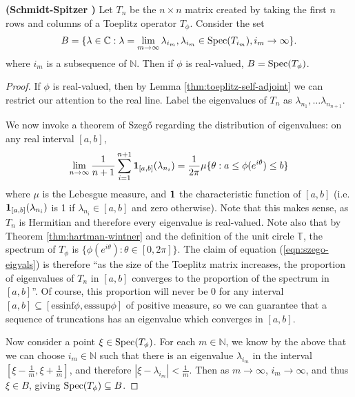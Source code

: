 \documentclass[../main.tex]{subfiles}
\begin{document}
\begin{theorem}{\textbf{(Schmidt-Spitzer \parencite{schmidt1960toeplitz})}}
Let $T_n$ be the $n \times n$ matrix created by taking the first $n$ rows and columns of a Toeplitz operator $T_\phi$. Consider the set
$$B = \{\lambda \in \mathbb{C} : \lambda = \lim_{m \rightarrow \infty} \lambda_{i_m}, \lambda_{i_m} \in \mathrm{Spec}(T_{i_m}), i_m \rightarrow \infty \}.$$
where $i_m$ is a subsequence of $\mathbb{N}$. Then if $\phi$ is real-valued, $B = \mathrm{Spec}(T_\phi)$.
\end{theorem}
\begin{proof}
If $\phi$ is real-valued, then by Lemma \ref{thm:toeplitz-self-adjoint} we can restrict our attention to the real line. Label the eigenvalues of $T_n$ as $\lambda_{n_1}, \hdots \lambda_{n_{n+1}}$. 
 
 We now invoke a theorem of Szeg\H{o} \cite{grenander2001toeplitz} regarding the distribution of eigenvalues: on any real interval $[a, b]$,
\begin{equation}\label{eqn:szego-eigvals}
\lim_{n \rightarrow \infty} \frac{1}{n+1} \sum_{i=1}^{n+1} \mathbf{1}_{[a, b]}(\lambda_{n_i}) = \frac{1}{2 \pi} \mu\{\theta : a \leq \phi(e^{i \theta}) \leq b\}
\end{equation}
where $\mu$ is the Lebesgue measure, and $\mathbf{1}$ the characteristic function of $[a,b]$ 
(i.e. $\mathbf{1}_{[a, b]}(\lambda_{n_i})$ is 1 if $\lambda_{n_i} \in [a, b]$ and zero otherwise). Note that this makes sense, as $T_n$ is Hermitian and
therefore every eigenvalue is real-valued. Note also that by Theorem \ref{thm:hartman-wintner} and the definition of the unit circle $\mathbb{T}$,
the spectrum of $T_\phi$ is $\{\phi(e^{i \theta}): \theta \in [0, 2\pi]\}$. The claim of equation (\ref{eqn:szego-eigvals}) is therefore 
``as the size of the Toeplitz matrix increases, the proportion of eigenvalues of $T_n$ in $[a, b]$ converges to the proportion of the spectrum in $[a, b]$''. 
Of course, this proportion will never be 0 for any interval $[a, b] \subseteq [\textrm{essinf}\phi, \textrm{esssup}\phi]$ of positive measure, so we can guarantee that a sequence of truncations has an eigenvalue which converges in $[a, b]$. 

Now consider a point $\xi \in \mathrm{Spec}(T_\phi)$. For each $m \in \mathbb{N}$, we know by the above that we can choose $i_m \in \mathbb{N}$ such that there is an eigenvalue $\lambda_{i_m}$ in the interval $[\xi - \frac{1}{m}, \xi + \frac{1}{m}]$, and therefore $|\xi - \lambda_{i_m}| < \frac{1}{m}$. Then as $m \rightarrow \infty$, $i_m \rightarrow \infty$, and thus $\xi \in B$, giving $\mathrm{Spec}(T_\phi) \subseteq B$.


\end{proof}
\end{document}
